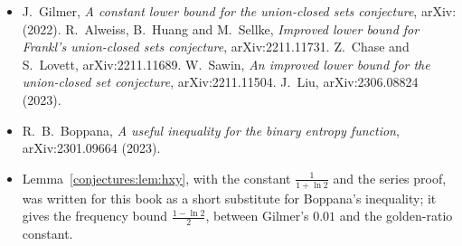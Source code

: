 \begin{itemize}
arXiv:1309.3297: the origin of the conjecture and the small cases.
\item J.~Gilmer, \emph{A constant lower bound for the union-closed sets conjecture}, arXiv: (2022). R.~Alweiss, B.~Huang and M.~Sellke,
\emph{Improved lower bound for Frankl's union-closed sets conjecture}, arXiv:2211.11731. Z.~Chase and S.~Lovett, arXiv:2211.11689. W.~Sawin,
\emph{An improved lower bound for the union-closed set conjecture}, arXiv:2211.11504. J.~Liu, arXiv:2306.08824 (2023).
\item R.~B.~Boppana, \emph{A useful inequality for the binary entropy function}, arXiv:2301.09664 (2023).
\item Lemma~\ref{conjectures:lem:hxy}, with the constant $\frac1{1+\ln2}$ and the series proof, was written for this book as a short substitute for Boppana's
inequality; it gives the frequency bound $\frac{1-\ln2}2$, between Gilmer's $0.01$ and the golden-ratio constant.
\end{itemize}
